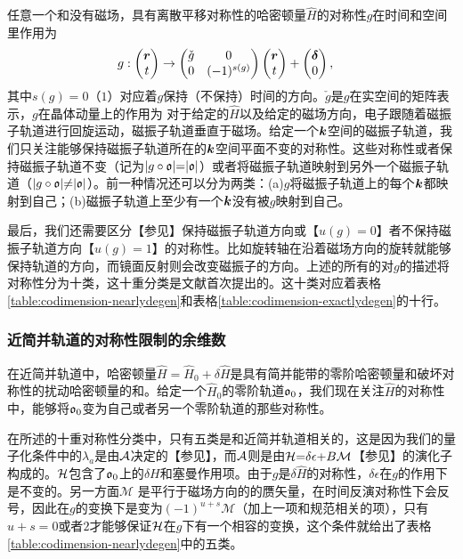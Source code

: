 任意一个和没有磁场，具有离散平移对称性的哈密顿量$\hat{H}$的对称性$g$在时间和空间里作用为
\begin{align}
&g: \begin{pmatrix} {\boldsymbol{r}}\\{t} \end{pmatrix} \rightarrow \begin{pmatrix} \check{g} & 0 \\ 0 &  (-1)^{s(g)} \end{pmatrix}\begin{pmatrix} {\boldsymbol{r}}\\{t} \end{pmatrix}+\begin{pmatrix} {\boldsymbol{\delta}}\\{0} \end{pmatrix}, \label{definesg}
\end{align}
其中$s(g){=}0$（$1$）对应着$g$保持（不保持）时间的方向。$\check{g}$是$g$在实空间的矩阵表示，$g$在晶体动量上的作用为
对于给定的$\hat{H}$以及给定的磁场方向，电子跟随着磁振子轨道进行回旋运动，磁振子轨道垂直于磁场。给定一个$\boldsymbol{k}$空间的磁振子轨道，我们只关注能够保持磁振子轨道所在的$\boldsymbol{k}$空间平面不变的对称性。这些对称性或者保持磁振子轨道不变（记为$|g\circ\mathfrak{o}|{=}|\mathfrak{o}|$）或者将磁振子轨道映射到另外一个磁振子轨道（$|g\circ\mathfrak{o}|{\ne}|\mathfrak{o}|$）。前一种情况还可以分为两类：(a)$g$将磁振子轨道上的每个$\boldsymbol{k}$都映射到自己；(b)磁振子轨道上至少有一个$\boldsymbol{k}$没有被$g$映射到自己。

最后，我们还需要区分【参见】保持磁振子轨道方向或【$u(g){=}0$】者不保持磁振子轨道方向【$u(g){=}1$】的对称性。比如旋转轴在沿着磁场方向的旋转就能够保持轨道的方向，而镜面反射则会改变磁振子的方向。上述的所有的对$g$的描述将对称性分为十类，这十重分类是文献首次提出的。这十类对应着表格\ref{table:codimension-nearlydegen}和表格\ref{table:codimension-exactlydegen}的十行。

\subsubsection{近简并轨道的对称性限制的余维数}\label{sec:codimquasideg}

在近简并轨道中，哈密顿量$\hat{H}{=}\hat{H}_0{+}\delta \hat{H}$是具有简并能带的零阶哈密顿量和破坏对称性的扰动哈密顿量的和。给定一个$\hat{H}_0$的零阶轨道$\mathfrak{o}_0$，我们现在关注$\hat{H}$的对称性中，能够将$\mathfrak{o}_0$变为自己或者另一个零阶轨道的那些对称性。


在所述的十重对称性分类中，只有五类是和近简并轨道相关的，这是因为我们的量子化条件中的$\lambda_a$是由${\cal A}$决定的【参见】，而${\cal A}$则是由$\mathcal{H}{=}\delta\epsilon{+}B \mathcal{M}$【参见】的演化子构成的。$\mathcal{H}$包含了$\mathfrak{o}_0$上的$\delta H$和塞曼作用项。由于$g$是$\delta \hat{H}$的对称性，$\delta\epsilon$在$g$的作用下是不变的。另一方面$\mathcal{M}$ 是平行于磁场方向的的赝矢量，在时间反演对称性\cite{sakurai1995modern}下会反号，因此在$g$的变换下是变为$(-1)^{u+s}\mathcal{M}$（加上一项和规范相关的项\cite{100p}），只有$u{+}s{=}0$或者$2$才能够保证$\mathcal{H}$在$g$下有一个相容的变换，这个条件就给出了表格\ref{table:codimension-nearlydegen}中的五类。

